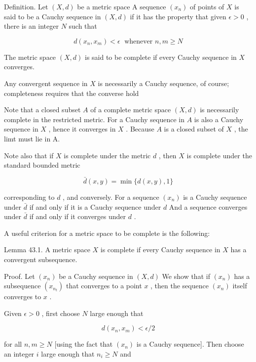 \documentclass[10pt]{article}
\begin{document}
Definition. Let \(\left( {X,d}\right)\) be a metric space A sequence \(\left( {x}_{n}\right)\) of points of \(X\) is said to be a Cauchy sequence in \(\left( {X,d}\right)\) if it has the property that given \(\epsilon  > 0\) , there is an integer \(N\) such that

\[
d\left( {{x}_{n},{x}_{m}}\right)  < \epsilon \;\text{ whenever }n,m \geq  N
\]

The metric space \(\left( {X,d}\right)\) is said to be complete if every Cauchy sequence in \(X\) converges.

Any convergent sequence in \(X\) is necessarily a Cauchy sequence, of course; completeness requires that the converse hold

Note that a closed subset \(A\) of a complete metric space \(\left( {X,d}\right)\) is necessarily complete in the restricted metric. For a Cauchy sequence in \(A\) is also a Cauchy sequence in \(X\) , hence it converges in \(X\) . Because \(A\) is a closed subset of \(X\) , the limt must lie in A.

Note also that if \(X\) is complete under the metric \(d\) , then \(X\) is complete under the standard bounded metric

\[
\bar{d}\left( {x,y}\right)  = \min \{ d\left( {x,y}\right) ,1\}
\]

corresponding to \(d\) , and conversely. For a sequence \(\left( {x}_{n}\right)\) is a Cauchy sequence under \(\bar{d}\) if and only if it is a Cauchy sequence under \(d\) And a sequence converges under \(\bar{d}\) if and only if it converges under \(d\) .

A useful criterion for a metric space to be complete is the following:

Lemma 43.1. A metric space \(X\) is complete if every Cauchy sequence in \(X\) has a convergent subsequence.

Proof. Let \(\left( {x}_{n}\right)\) be a Cauchy sequence in \(\left( {X,d}\right)\) We show that if \(\left( {x}_{n}\right)\) has a subsequence \(\left( {x}_{{n}_{t}}\right)\) that converges to a point \(x\) , then the sequence \(\left( {x}_{n}\right)\) itself converges to \(x\) .

Given \(\epsilon  > 0\) , first choose \(N\) large enough that

\[
d\left( {{x}_{n},{x}_{m}}\right)  < \epsilon /2
\]

for all \(n,m \geq  N\) [using the fact that \(\left( {x}_{n}\right)\) is a Cauchy sequence]. Then choose an integer \(i\) large enough that \({n}_{i} \geq  N\) and
\end{document}
